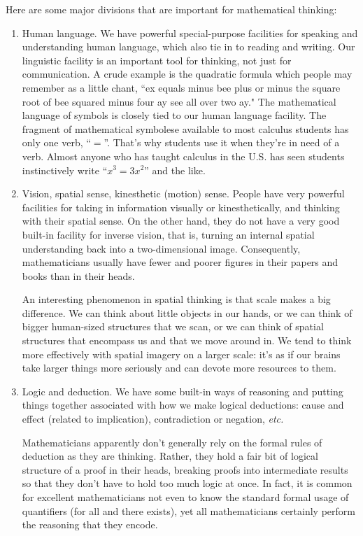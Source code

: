 Here are some major divisions that are important for 
mathematical thinking: 
\begin{enumerate}
\item Human language.  We have powerful special-purpose
facilities for speaking and understanding human language, 
which also tie
in to reading and writing.  Our linguistic facility is an 
important
tool for thinking, not just for communication.  A crude
example is the quadratic formula which people may remember 
as a little chant,
``ex equals minus bee plus or minus the square root of bee 
squared
minus four ay see all over two ay."   The
mathematical language of symbols is closely tied to our 
human language facility.
The fragment of mathematical symbolese available to most 
calculus students
has only one verb, ``\<$=$''.  That's why students use it
when they're in need of a verb.  Almost anyone who has 
taught calculus
in the U.S. has seen students instinctively write ``\<$x^3 
= 3 x^2$'' and the
like.
\item  Vision, spatial sense, kinesthetic (motion) sense.
People have very powerful facilities for taking in 
information visually
or kinesthetically, and thinking with their spatial sense. 
 On the other
hand, they do not have a very good built-in facility for 
inverse vision,
that is, turning an internal spatial understanding back 
into a two-dimensional
image.  Consequently, mathematicians usually have fewer 
and poorer
figures in their papers and books than in their heads.

An interesting phenomenon in spatial thinking is that 
scale makes
a big difference.  We can think about little objects in 
our hands, or we can
think of bigger human-sized structures that we scan, or we 
can think of
spatial structures that encompass us and that we move 
around in. 
We tend to think more effectively with spatial imagery on 
a larger scale:
it's as if our brains take larger things more seriously 
and can
devote more resources to them.

\item  Logic and deduction.  We have some built-in ways of
reasoning and putting things together associated with how 
we make logical
deductions:  cause and effect (related to implication),
contradiction or negation, {\it etc.} 

Mathematicians apparently don't generally
rely on the formal rules of deduction as they are 
thinking.  Rather, they hold
a fair bit of logical structure of a proof in their heads, 
breaking 
proofs into intermediate results so that they don't have 
to hold too much 
logic at once.  In fact, it is common for excellent 
mathematicians not even to
know the standard
formal usage of quantifiers (for all and there exists), 
yet all
mathematicians certainly perform the reasoning that they 
encode.


\end{enumerate}
